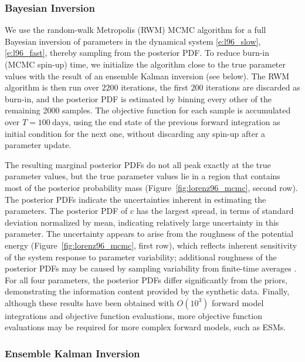 \documentclass[draft]{agujournal}
\begin{document}
\subsubsection{Bayesian Inversion}

We use the random-walk Metropolis (RWM) MCMC algorithm \citep{Brooks11a} for a full Bayesian inversion of parameters in the dynamical system \eqref{e:l96_slow}, \eqref{e:l96_fast}, thereby sampling from the posterior PDF. To reduce burn-in (MCMC spin-up) time, we initialize the algorithm close to the true parameter values with the result of an ensemble Kalman inversion (see below). The RWM algorithm is then run over $2200$ iterations, the first $200$ iterations are discarded as burn-in, and the posterior PDF is estimated by binning every other of the remaining 2000 samples. The objective function for each sample is accumulated over $T=100~\mathrm{days}$, using the end state of the previous forward integration as initial condition for the next one, without discarding any spin-up after a parameter update. 

The resulting marginal posterior PDFs do not all peak exactly at the true parameter values, but the true parameter values lie in a region that contains most of the posterior probability mass (Figure~\ref{fig:lorenz96_mcmc}, second row). The posterior PDFs indicate the uncertainties inherent in estimating the parameters. The posterior PDF of $c$ has the largest spread, in terms of standard deviation normalized by mean, indicating relatively large uncertainty in this parameter. The uncertainty appears to arise from the roughness of the potential energy (Figure~\ref{fig:lorenz96_mcmc}, first row), which reflects inherent sensitivity of the system response to parameter variability; additional roughness of the posterior PDFs may be caused by sampling variability from finite-time  averages \citep{Wang14c}. For all four parameters, the posterior PDFs differ significantly from the priors, demonstrating the information content provided by the synthetic data. Finally, although these results have been obtained with $O(10^3)$ forward model integrations and objective function evaluations, more objective function evaluations may be required for more complex forward models, such as ESMs. 

\subsubsection{Ensemble Kalman Inversion}
\end{document}
